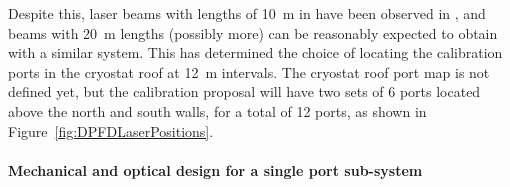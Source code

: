 Despite this, laser beams with lengths of \SI{10}{\m} in  have been observed in , and beams with \SI{20}{\m} lengths (possibly more) can be reasonably expected to obtain with a similar system. This has determined the choice of locating the calibration ports in the cryostat roof at \SI{12}{\m} intervals. The   cryostat roof port map is not defined yet, but the calibration proposal will have two sets of \num{6} ports located above the north and south walls, for a total of \num{12} ports, as shown in Figure~\ref{fig:DPFDLaserPositions}.

\paragraph{Mechanical and optical design for a single port sub-system}

